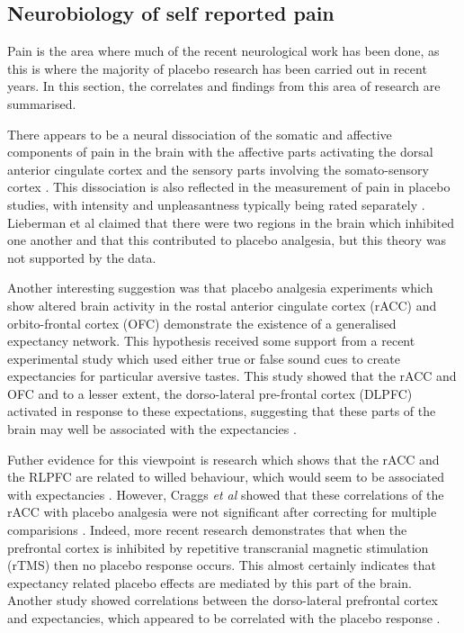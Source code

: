\subsection{Neurobiology of self reported pain}
\label{sec:neur-self-report}

Pain is the area where much of the recent neurological work has been done, as this is where the majority of placebo research has been carried out in recent years. In this section, the correlates and findings from this area of research are summarised. 

There appears to be a neural dissociation of the somatic and affective components of pain in the brain with the affective parts activating the dorsal anterior cingulate cortex and the sensory parts involving the somato-sensory cortex \cite{Lieberman2004}. This dissociation is also reflected in the measurement of pain in placebo studies, with intensity and unpleasantness typically being rated separately \cite{Price2008}. Lieberman et al claimed that there were two regions in the brain which inhibited one another and that this contributed to placebo analgesia, but this theory was not supported by the data. 

Another interesting suggestion was that placebo analgesia experiments which show altered brain activity in the rostal anterior cingulate cortex (rACC) and orbito-frontal cortex (OFC) demonstrate the existence of a generalised expectancy network. This hypothesis received some support from a recent experimental study which used either true or false sound cues to create expectancies for particular aversive tastes. This study showed that the rACC and OFC and to a lesser extent, the dorso-lateral pre-frontal cortex (DLPFC) activated in response to these expectations, suggesting that these parts of the brain may well be associated with the expectancies  \cite{Sarinopoulos2006}. 

Futher evidence for this viewpoint is research which shows that the rACC and the RLPFC are related to willed behaviour, which would seem to be associated with expectancies \cite{Beauregard2007a}.  However, Craggs \textit{et al} showed that these correlations of the rACC with placebo analgesia were not significant after correcting for multiple comparisions \cite{Craggs2008a}. Indeed, more recent research \cite{krummenacher2010prefrontal} demonstrates that when the prefrontal cortex is inhibited by repetitive transcranial magnetic stimulation (rTMS) then no placebo response occurs. This almost certainly indicates that expectancy related placebo effects are mediated by this part of the brain. Another study showed correlations between the dorso-lateral prefrontal cortex and expectancies, which appeared to be correlated with the placebo response \cite{Zubieta2006}. 

